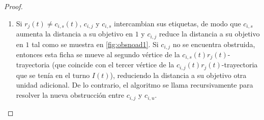 \begin{proof}
\begin{enumerate}
\begin{enumerate}
            \item Si $r_j(t)\neq c_{i,s}(t)$, $c_{i,j}$ y $c_{i,s}$ intercambian
            sus etiquetas, de modo que $c_{i,s}$ aumenta la distancia a su
            objetivo en $1$ y $c_{i,j}$ reduce la distancia a su objetivo en $1$
            tal como se muestra en \cref{fig:obsnoad1}. Si $c_{i,j}$ no se
            encuentra obstruida, entonces esta ficha se mueve al segundo
            v\'ertice de la $c_{i,s}(t)r_j(t)$-trayectoria (que coincide con el
            tercer v\'ertice de la $c_{i,j}(t)r_j(t)$-trayectoria que se ten\'ia
            en el turno $I(t)$), reduciendo la distancia a su objetivo otra
            unidad adicional. De lo contrario, el algoritmo se llama
            recursivamente para resolver la nueva obstrucci\'on entre $c_{i,j}$
            y $c_{i,u}$.

            \begin{figure}[!htbp]
                \begin{tcbitemize}[raster columns=2, raster equal height,
                enhanced, colback=Black!5!white,colframe=Grey!75!black, attach
                title to upper,
                phantom={\setcounter{myrasternum}{\thetcbrasternum}},
                title={(\alph{myrasternum})\enspace}, halign lower=center,
                halign upper = left, lower separated=false, middle=0mm,
                boxsep=0mm, leftupper=2mm, fonttitle=\bfseries, coltitle=black,
                raster column skip=1mm,raster halign=center, raster row
                skip=1mm]
        

\end{tcbitemize}
\end{figure}
\end{enumerate}
\end{enumerate}
\end{proof}
